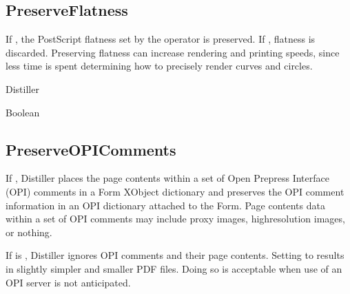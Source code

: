 \documentclass[letterpaper,12pt,english,openany,oneside]{sphinxmanual}
\begin{document}
\label{\detokenize{PDF_Create_CommonSettings:default-value-97}}

\begin{sphinxVerbatim}[commandchars=\\\{\}]
\end{sphinxVerbatim}




\subsection{PreserveFlatness}
\label{\detokenize{PDF_Create_CommonSettings:preserveflatness}}
If  , the PostScript flatness set by the  operator is preserved. If  , flatness is discarded. Preserving flatness can increase rendering and printing speeds, since less time is spent determining how to precisely render curves and circles.

\label{\detokenize{PDF_Create_CommonSettings:supported-by-104}}

Distiller

\label{\detokenize{PDF_Create_CommonSettings:type-103}}

Boolean

\label{\detokenize{PDF_Create_CommonSettings:default-value-98}}

\begin{sphinxVerbatim}[commandchars=\\\{\}]
\end{sphinxVerbatim}




\subsection{PreserveOPIComments}
\label{\detokenize{PDF_Create_CommonSettings:preserveopicomments}}
If  , Distiller places the page contents within a set of Open Prepress Interface (OPI) comments in a Form XObject dictionary and preserves the OPI comment information in an OPI dictionary attached to the Form. Page contents data within a set of OPI comments may include proxy images, high\sphinxhyphen{}resolution images, or nothing.

If  is  , Distiller ignores OPI comments and their page contents. Setting  to  results in slightly simpler and smaller PDF files. Doing so is acceptable when use of an OPI server is not anticipated.
\end{document}
